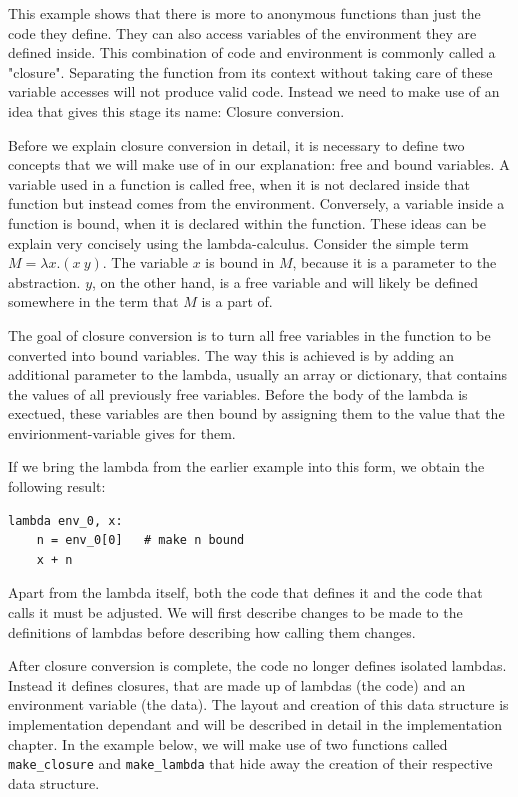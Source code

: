 \documentclass[11pt]{report}
\begin{document}
This example shows that there is more to anonymous functions than just the code they define. They can also access variables of the environment they are defined inside. This combination of code and environment is commonly called a "closure". Separating the function from its context without taking care of these variable accesses will not produce valid code. Instead we need to make use of an idea that gives this stage its name: Closure conversion.

Before we explain closure conversion in detail, it is necessary to define two concepts that we will make use of in our explanation: free and bound variables. A variable used in a function is called free, when it is not declared inside that function but instead comes from the environment. Conversely, a variable inside a function is bound, when it is declared within the function. These ideas can be explain very concisely using the lambda-calculus. Consider the simple term $M = \lambda x.(x\ y)$. The variable $x$ is bound in $M$, because it is a parameter to the abstraction. $y$, on the other hand, is a free variable and will likely be defined somewhere in the term that $M$ is a part of.

The goal of closure conversion is to turn all free variables in the function to be converted into bound variables. The way this is achieved is by adding an additional parameter to the lambda, usually an array or dictionary, that contains the values of all previously free variables. Before the body of the lambda is exectued, these variables are then bound by assigning them to the value that the envirionment-variable gives for them.


If we bring the lambda from the earlier example into this form, we obtain the following result:

\begin{lstlisting}
lambda env_0, x: 
    n = env_0[0]   # make n bound
    x + n
\end{lstlisting}

Apart from the lambda itself, both the code that defines it and the code that calls it must be adjusted. We will first describe changes to be made to the definitions of lambdas before describing how calling them changes.

After closure conversion is complete, the code no longer defines isolated lambdas. Instead it defines closures, that are made up of lambdas (the code) and an environment variable (the data). The layout and creation of this data structure is implementation dependant and will be described in detail in the implementation chapter. In the example below, we will make use of two functions called \texttt{make_closure} and \texttt{make_lambda} that hide away the creation of their respective data structure.
\end{document}
